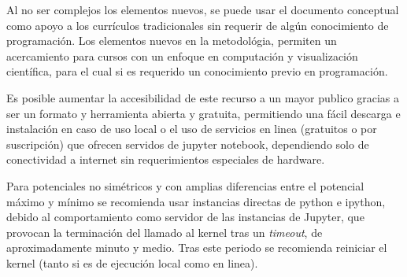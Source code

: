 \documentclass{article}
\begin{document}
Al no ser complejos los elementos nuevos, se puede usar el documento conceptual como apoyo a los currículos tradicionales sin requerir de algún conocimiento de programación. Los elementos nuevos en la metodológia, permiten un acercamiento para cursos con un enfoque en computación y visualización científica, para el cual si es requerido un conocimiento previo en programación.

Es posible aumentar la accesibilidad de este recurso a un mayor publico gracias a ser un formato y herramienta abierta y gratuita, permitiendo una fácil descarga e instalación en caso de uso local o el uso de servicios en linea (gratuitos o por suscripción) que ofrecen servidos de jupyter notebook, dependiendo solo de conectividad a internet sin requerimientos especiales de hardware.

Para potenciales no simétricos y con amplias diferencias entre el potencial máximo y mínimo se recomienda usar instancias directas de python e ipython, debido al comportamiento como servidor de las instancias de Jupyter, que provocan la terminación del llamado al kernel tras un \textit{timeout}, de aproximadamente minuto y medio. Tras este periodo se recomienda reiniciar el kernel (tanto si es de ejecución local como en linea).







\end{document}
